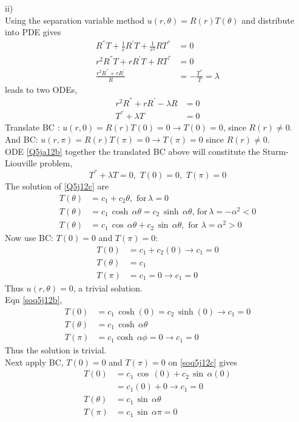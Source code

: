 ii)\\
Using the separation variable method $u(r,\theta)=R(r)T(\theta)$ and distribute into PDE gives
\begin{align}
R^{''}T+\frac{1}{r}R^{'}T+\frac{1}{r^2}RT^{''}&=0\nonumber\\
r^2R^{''}T+rR^{'}T+RT^{''}&=0\nonumber\\
\frac{r^2R^{''}+rR^{'}}{R}&=-\frac{T^{''}}{T}=\lambda\nonumber
\end{align}
leads to two ODEs,
\begin{align}
r^2R^{''}+rR^{'}-\lambda R&=0\label{Q5j12a}\\
T^{''}+\lambda T&=0\label{Q5ja12b}
\end{align}
Translate BC : $u(r,0)=R(r)T(0)=0\to T(0)=0$, since $R(r)\neq 0$. And BC: $u(r,\pi)=R(r)T(\pi)=0\to T(\pi)=0$ since $R(r)\neq 0$.\\
ODE \eqref{Q5ja12b} together the translated BC above will constitute the Sturm-Liouville problem,
\begin{equation}
T^{''}+\lambda T=0,\,\,T(0)=0,\,\,T(\pi)=0\label{Q5j12c}
\end{equation}
The solution of \eqref{Q5j12c} are
\begin{align}
T(\theta)&=c_1+c_2\theta,\,\,\text{for}\,\lambda=0\label{soq5j12a}\\
T(\theta)&=c_1\,\cosh\,\alpha\theta=c_2\,\sinh\,\alpha\theta,\,\text{for}\,\lambda=-\alpha^2<0\label{soq5j12b}\\
T(\theta)&=c_1\,\cos\,\alpha\theta+c_2\,\sin\,\alpha\theta,\,\,\text{for}\,\,\lambda=\alpha^2>0\label{soq5j12c}
\end{align}
Now use BC: $T(0)=0$ and $T(\pi)=0$:
\begin{align*}
T(0)&=c_1+c_2(0)\to c_1=0\\
T(\theta)&=c_1\\
T(\pi)&=c_1=0\to c_1=0
\end{align*}
Thus $u(r,\theta)=0$, a trivial solution. \\
Eqn \eqref{soq5j12b},
\begin{align*}
T(0)&=c_1\,\cosh(0)=c_2\,\sinh(0)\to c_1=0\\
T(\theta)&=c_1\,\cosh\,\alpha\theta\\
T(\pi)&=c_1\cosh\,\alpha\phi=0\to c_1=0
\end{align*}
Thus the solution is trivial.\\
Next apply BC, $T(0)=0$ and $T(\pi)=0$ on \eqref{soq5j12c} gives
\begin{align*}
T(0)&=c_1\,\cos\,(0)+c_2\,\sin\,\alpha(0)\\
&=c_1(0)+0\to c_1=0\\
T(\theta)&=c_1\,\sin\,\alpha\theta\\
T(\pi)&=c_1\,\sin\,\alpha\pi=0
\end{align*}
